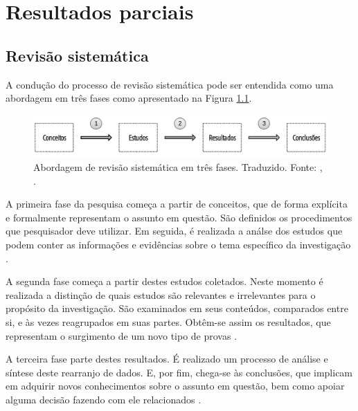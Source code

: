 \chapter[Resultados parciais]{Resultados parciais}\label{chap:resultados}


\section{Revisão sistemática}

A condução do processo de revisão sistemática pode ser entendida como uma abordagem em três fases como apresentado na Figura \ref{fig:fases_rs}.

\begin{figure}[!htb]
    \centering
    \includegraphics[scale=0.4]{figuras/fases_rs.png}    
    \caption{Abordagem de revisão sistemática em três fases. Traduzido. Fonte: \citeauthor{biolchini2005}, \citeyear{biolchini2005}.}
    \label{fig:fases_rs}
\end{figure}


A primeira fase da pesquisa começa a partir de conceitos, que de forma explícita e formalmente representam o assunto em questão. São definidos os procedimentos que pesquisador deve utilizar. Em seguida, é realizada a análse dos estudos que podem conter as informações e evidências sobre o tema específico da investigação \cite{biolchini2005}. 

A segunda fase começa a partir destes estudos coletados. Neste momento é realizada a distinção de quais estudos são relevantes e irrelevantes para o propósito da investigação. São examinados em seus conteúdos, comparados entre si, e às vezes reagrupados em suas partes. Obtêm-se assim os resultados, que representam o surgimento de um novo tipo de provas \cite{biolchini2005}. 

A terceira fase parte destes resultados. É realizado um processo de análise e síntese deste rearranjo de dados. E, por fim, chega-se às conclusões, que implicam em adquirir novos conhecimentos sobre o assunto em questão, bem como apoiar alguma decisão fazendo com ele relacionados \cite{biolchini2005}.





